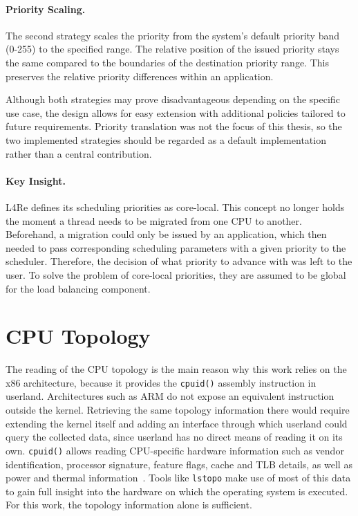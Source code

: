\paragraph{Priority Scaling.}

The second strategy scales the priority from the system's default priority band (0-255) to the specified range.
The relative position of the issued priority stays the same compared to the boundaries of the destination priority range. This preserves the relative priority differences within an application.

\medskip

Although both strategies may prove disadvantageous depending on the specific use case, the design allows for easy extension with additional policies tailored to future requirements.
Priority translation was not the focus of this thesis, so the two implemented strategies should be regarded as a default implementation rather than a central contribution.

\paragraph{Key Insight.}

L4Re defines its scheduling priorities as core-local.
This concept no longer holds the moment a thread needs to be migrated from one CPU to another.
Beforehand, a migration could only be issued by an application, which then needed to pass corresponding scheduling parameters with a given priority to the scheduler.
Therefore, the decision of what priority to advance with was left to the user.
To solve the problem of core-local priorities, they are assumed to be global for the load balancing component.

\section{CPU Topology}

The reading of the CPU topology is the main reason why this work relies on the x86 architecture, because it provides the \texttt{cpuid()} assembly instruction in userland.
Architectures such as ARM do not expose an equivalent instruction outside the kernel.
Retrieving the same topology information there would require extending the kernel itself and adding an interface through which userland could query the collected data, since userland has no direct means of reading it on its own.
\texttt{cpuid()} allows reading CPU-specific hardware information such as vendor identification, processor signature, feature flags, cache and TLB details, as well as power and thermal information~\cite{intel-cpuid}.
Tools like \texttt{lstopo} make use of most of this data to gain full insight into the hardware on which the operating system is executed.
For this work, the topology information alone is sufficient.

